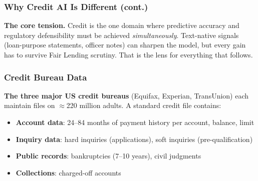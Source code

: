 \documentclass[9pt,t]{beamer}
\begin{document}
\begin{frame}
\frametitle{Why Credit AI Is Different (cont.)}

\begin{bigpicture}
  \textbf{The core tension.} Credit is the one domain where predictive accuracy and
  regulatory defensibility must be achieved \emph{simultaneously}. Text-native signals
  (loan-purpose statements, officer notes) can sharpen the model, but every gain has to
  survive Fair Lending scrutiny. That is the lens for everything that follows.
\end{bigpicture}
\end{frame}

\begin{frame}
\frametitle{Credit Bureau Data}

\textbf{The three major US credit bureaus} (Equifax, Experian, TransUnion) each maintain
files on $\approx$220 million adults. A standard credit file contains:

\begin{itemize}
  \item \textbf{Account data}: 24--84 months of payment history per account, balance, limit
  \item \textbf{Inquiry data}: hard inquiries (applications), soft inquiries (pre-qualification)
  \item \textbf{Public records}: bankruptcies (7--10 years), civil judgments
  \item \textbf{Collections}: charged-off accounts
\end{itemize}
\end{frame}
\end{document}

